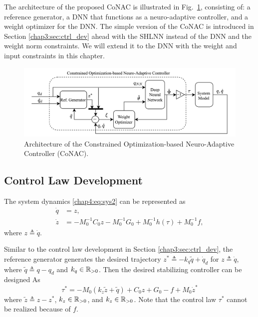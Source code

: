 The architecture of the proposed CoNAC is illustrated in Fig.~\ref{chap4:fig:ctrl}, consisting of: a reference generator, a DNN that functions as a neuro-adaptive controller, and a weight optimizer for the DNN. 
The simple version of the CoNAC is introduced in Section \ref{chap3:sec:ctrl_dev} ahead with the SHLNN instead of the DNN and the weight norm constraints.
We will extend it to the DNN with the weight and input constraints in this chapter.

\begin{figure}[t]
    \centering
    \includegraphics[width=0.9\linewidth]{imgs/ControllerChap4.drawio.png}
    \caption{Architecture of the Constrained Optimization-based Neuro-Adaptive Controller (CoNAC).}
    \label{chap4:fig:ctrl}
\end{figure}

\subsection{Control Law Development}

The system dynamics \eqref{chap4:eq:sys2} can be represented as
\begin{equation}
    \begin{aligned}
        \dot {q} &= {z},\\
        \dot {z} &= -M_0^{-1} C_0 {z}-M_0^{-1} G_0+M_0^{-1} h(\tau) + M_0^{-1} f,
    \end{aligned}
    \label{chap4:eq:x_dyna}
\end{equation}
where ${z}\triangleq \dot q$.

Similar to the control law development in Section \ref{chap3:sec:ctrl_dev}, the reference generator generates the desired trajectory $z^*\triangleq -k_q\tilde q+\dot q_d$ for $z\triangleq \dot q$, where $\tilde q\triangleq q-q_d$ and $k_q\in\mathbb{R}_{>0}$.
Then the desired stabilizing controller can be designed As
\begin{equation}
    \tau^* = -M_0(k_z\tilde z+\tilde q)+C_0 z+G_0-f+M_0\dot z^*
    \label{chap4:eq:desired_control}
\end{equation}
where $\tilde z\triangleq z-z^*$, $k_z\in\mathbb{R}_{>0}$, and $k_z\in\mathbb{R}_{>0}$.
Note that the control law $\tau^*$ cannot be realized because of $f$.

